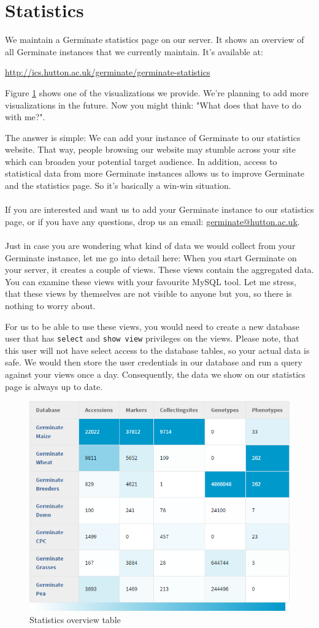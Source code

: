 \section{Statistics}
We maintain a Germinate statistics page on our server. It shows an overview of all Germinate instances that we currently maintain. It's available at:
\begin{center}
	\url{http://ics.hutton.ac.uk/germinate/germinate-statistics}
\end{center}
\noindent
Figure \ref{fig:statistics-overview-table} shows one of the visualizations we provide. We're planning to add more visualizations in the future. Now you might think: "What does that have to do with me?".

The answer is simple: We can add your instance of Germinate to our statistics website. That way, people browsing our website may stumble across your site which can broaden your potential target audience. In addition, access to statistical data from more Germinate instances allows us to improve Germinate and the statistics page. So it's basically a win-win situation.\\
\\
If you are interested and want us to add your Germinate instance to our statistics page, or if you have any questions, drop us an email: \url{germinate@hutton.ac.uk}.\\
\\
Just in case you are wondering what kind of data we would collect from your Germinate instance, let me go into detail here: When you start Germinate on your server, it creates a couple of views. These views contain the aggregated data. You can examine these views with your favourite MySQL tool. Let me stress, that these views by themselves are not visible to anyone but you, so there is nothing to worry about.

For us to be able to use these views, you would need to create a new database user that has \texttt{select} and \texttt{show view} privileges on the views. Please note, that this user will not have select access to the database tables, so your actual data is safe. We would then store the user credentials in our database and run a query against your views once a day. Consequently, the data we show on our statistics page is always up to date.

\begin{figure}
	\centering
	\includegraphics[scale=0.6]{img/statistics/overview-table.png}
	\caption{Statistics overview table}
	\label{fig:statistics-overview-table}
\end{figure}